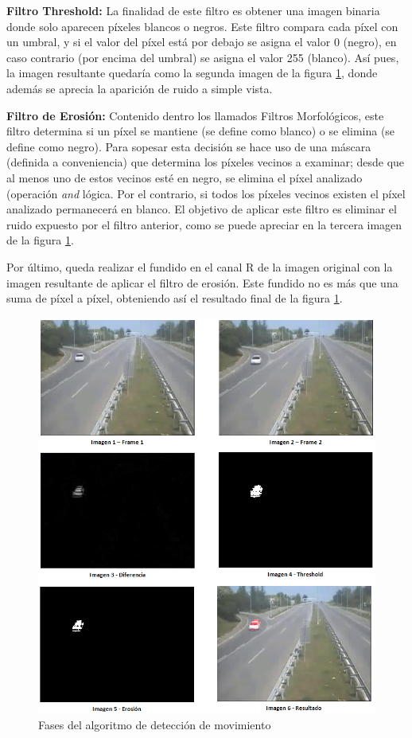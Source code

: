 \documentclass[twocolumn,twoside]{Jornadas}
\begin{document}

\textbf{Filtro Threshold:} La finalidad de este filtro es obtener una imagen binaria donde solo aparecen píxeles blancos o negros. Este filtro compara cada píxel con un umbral, y si el valor del píxel está por debajo se asigna el valor 0 (negro), en caso contrario (por encima del umbral) se asigna el valor 255 (blanco). Así pues, la imagen resultante quedaría como la segunda imagen de la figura \ref{fig:joined}, donde además se aprecia la aparición de ruido a simple vista.


\textbf{Filtro de Erosión:} Contenido dentro los llamados Filtros Morfológicos, este filtro determina si un píxel se mantiene (se define como blanco) o se elimina (se define como negro). Para sopesar esta decisión se hace uso de una máscara (definida a conveniencia) que determina los píxeles vecinos a examinar; desde que al menos uno de estos vecinos esté en negro, se elimina el píxel analizado (operación \emph{and} lógica. Por el contrario, si todos los píxeles vecinos existen el píxel analizado permanecerá en blanco. El objetivo de aplicar este filtro es eliminar el ruido expuesto por el filtro anterior, como se puede apreciar en la tercera imagen de la figura \ref{fig:joined}.


Por último, queda realizar el fundido en el canal R de la imagen original con la imagen resultante de aplicar el filtro de erosión. Este fundido no es más que una suma de píxel a píxel, obteniendo así el resultado final de la figura \ref{fig:joined}.

\begin{figure}[t]
   \begin{center}
      \includegraphics[width=.5\textwidth]{joined.png}
      \caption{\label{fig:joined}Fases del algoritmo de detección de movimiento}
   \end{center}
\end{figure}
\end{document}
